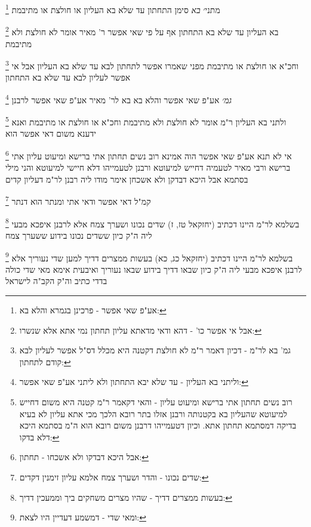 \documentclass[12pt, openany]{book}
\newcommand{\footnotecomment}[1]{
	\renewcommand\thefootnote{}
	\footnote{#1}}
\newcommand{\commenta}[1]{\footnotecomment{#1}}
\begin{document}
{{\commenta{אע"פ שאי אפשר - פרכינן בגמרא והלא בא:}
מתני׳ {\large\emph{בא}} סימן התחתון עד שלא בא העליון או חולצת או מתיבמת
\commenta{אבל אי אפשר כו' - דהא ודאי מדאתא עליון תחתון נמי אתא אלא שנשרו:}
בא העליון עד שלא בא התחתון אף על פי שאי אפשר ר' מאיר אומר לא חולצת ולא מתיבמת
\commenta{גמ' בא לר"מ - דכיון דאמר ר"מ לא חולצת דקטנה היא מכלל דס"ל אפשר לעליון לבא קודם לתחתון:}
וחכ"א או חולצת או מתיבמת מפני שאמרו אפשר לתחתון לבא עד שלא בא העליון אבל אי אפשר לעליון לבא עד שלא בא התחתון
\commenta{וליתני בא העליון - עד שלא יבא התחתון ולא ליתני אע"פ שאי אפשר:}
{\large\emph{גמ׳}} אע"פ שאי אפשר והלא בא בא לר' מאיר אע"פ שאי אפשר לרבנן 
\commenta{רוב נשים תחתון אתי ברישא ומיעוט עליון - והאי דקאמר ר"מ קטנה היא משום דחייש למיעוטא שהעליון בא בקטנותה ורבנן אזלו בתר רובא הלכך מכי אתא עליון לא בעיא בדיקה דמסתמא תחתון אתא. וכיון דטעמייהו דרבנן משום רובא הוא ה"מ בסתמא היכא דלא בדקו:}
ולתני בא העליון ר"מ אומר לא חולצת ולא מתיבמת וחכ"א או חולצת או מתיבמת ואנא ידענא משום דאי אפשר הוא 
\commenta{אבל היכא דבדקו ולא אשכחו - תחתון:}
אי לא תנא אע"פ שאי אפשר הוה אמינא רוב נשים תחתון אתי ברישא ומיעוט עליון אתי ברישא ורבי מאיר לטעמיה דחייש למיעוטא ורבנן לטעמייהו דלא חיישי למיעוטא 
והני מילי בסתמא אבל היכא דבדקן ולא אשכחן אימר מודו ליה רבנן לר"מ דעליון קדים
\commenta{שדים נכונו - והדר ושערך צמח אלמא עליון זימנין דקדים:}
קמ"ל דאי אפשר ודאי אתי ומנתר הוא דנתר 
\commenta{בעשות ממצרים דדיך - שהיו מצרים משחקים ביך וממעכין דדיך:}
בשלמא לר"מ היינו דכתיב (יחזקאל טז, ז) שדים נכונו ושערך צמח אלא לרבנן איפכא מבעי ליה ה"ק כיון ששדים נכונו בידוע ששערך צמח 
\commenta{ומאי שדי - דמשמע דעדיין היו לצאת:}
בשלמא לר"מ היינו דכתיב (יחזקאל כג, כא) בעשות ממצרים דדיך למען שדי נעוריך אלא לרבנן איפכא מבעי ליה 
ה"ק כיון שבאו דדיך בידוע שבאו נעוריך ואיבעית אימא מאי שדי כולה בדדי כתיב וה"ק הקב"ה לישראל}

}
\end{document}
